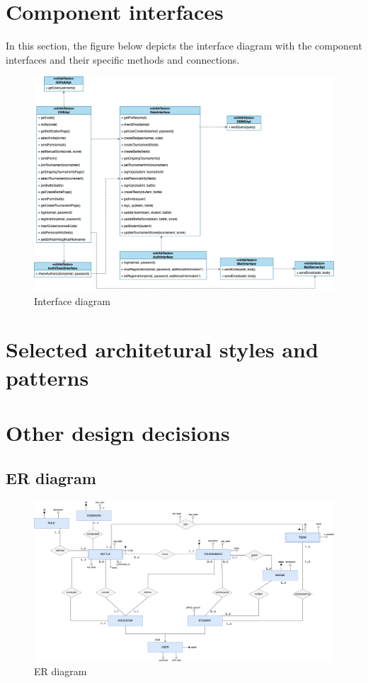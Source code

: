 \section{Component interfaces}
In this section, the figure below depicts the interface diagram with the component interfaces and their specific methods and connections.
\begin{figure}[H]
    \centering
    \includegraphics[width=1\textwidth]{images/Interface_diagram.png}
    \caption{Interface diagram}
\end{figure}

\section{Selected architetural styles and patterns}
\section{Other design decisions}
\subsection{ER diagram}
\begin{figure}[H]
    \centering
    \includegraphics[width=1\textwidth]{images/ER_diagram.png}
    \caption{ER diagram}
\end{figure}